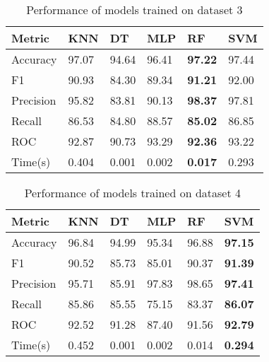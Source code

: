 {    \begin{table}[hbt]
        \caption{Performance of models trained on dataset 3} \label{tab:performance_of_models_trained_on_dataset_3}
        \begin{tabular*}{\tblwidth}{@{}LLLLLL@{}}
            \toprule
            Metric & KNN & DT & MLP & \textbf{RF} & SVM \\
            \midrule
            Accuracy & 97.07 & 94.64 & 96.41 & \textbf{97.22} & 97.44 \\
            F1 & 90.93 & 84.30 & 89.34 & \textbf{91.21} & 92.00 \\
            Precision & 95.82 & 83.81 & 90.13 & \textbf{98.37} & 97.81 \\
            Recall & 86.53 & 84.80 & 88.57 & \textbf{85.02} & 86.85 \\
            ROC & 92.87 & 90.73 & 93.29 & \textbf{92.36} & 93.22 \\
            Time(s) & 0.404 & 0.001 & 0.002 & \textbf{0.017} & 0.293 \\
            \bottomrule
        \end{tabular*}
    \end{table}

    \begin{table}[hbt]
        \caption{Performance of models trained on dataset 4} \label{tab:performance_of_models_trained_on_dataset_4}
        \begin{tabular*}{\tblwidth}{@{}LLLLLL@{}}
            \toprule
            Metric & KNN & DT & MLP & RF & \textbf{SVM} \\
            \midrule
            Accuracy & 96.84 & 94.99 & 95.34 & 96.88 & \textbf{97.15} \\
            F1 & 90.52 & 85.73 & 85.01 & 90.37 & \textbf{91.39} \\
            Precision & 95.71 & 85.91 & 97.83 & 98.65 & \textbf{97.41} \\
            Recall & 85.86 & 85.55 & 75.15 & 83.37 & \textbf{86.07} \\
            ROC & 92.52 & 91.28 & 87.40 & 91.56 & \textbf{92.79} \\
            Time(s) & 0.452 & 0.001 & 0.002 & 0.014 & \textbf{0.294} \\
            \bottomrule
        \end{tabular*}
    \end{table}

}
